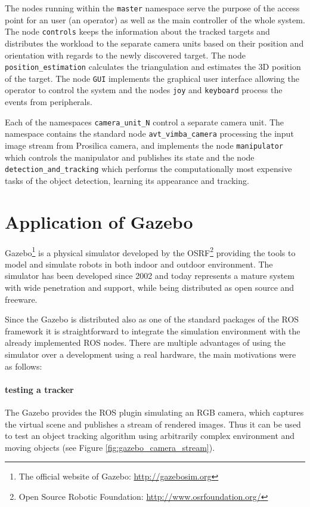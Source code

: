 The nodes running within the \texttt{master} namespace serve the purpose of the access point for an user (an operator) as well as the main controller of the whole system. The node \texttt{controls} keeps the information about the tracked targets and distributes the workload to the separate camera units based on their position and orientation with regards to the newly discovered target. The node \texttt{position\_estimation} calculates the triangulation and estimates the 3D position of the target. The node \texttt{GUI} implements the graphical user interface allowing the operator to control the system and the nodes \texttt{joy} and \texttt{keyboard} process the events from peripherals.

Each of the namespaces \texttt{camera\_unit\_N} control a separate camera unit. The namespace contains the standard node \texttt{avt\_vimba\_camera} processing the input image stream from Prosilica camera, and implements the node \texttt{manipulator} which controls the manipulator and publishes its state and the node \texttt{detection\_and\_tracking} which performs the computationally most expensive tasks of the object detection, learning its appearance and tracking.

\section{Application of Gazebo} \label{txt:application_of_gazebo}

Gazebo\footnote{The official website of Gazebo: \url{http://gazebosim.org}} is a physical simulator developed by the OSRF\footnote{Open Source Robotic Foundation: \url{http://www.osrfoundation.org/}} providing the tools to model and simulate robots in both indoor and outdoor environment. The simulator has been developed since 2002 and today represents a mature system with wide penetration and support, while being distributed as open source and freeware. 

Since the Gazebo is distributed also as one of the standard packages of the ROS framework it is straightforward to integrate the simulation environment with the already implemented ROS nodes. There are multiple advantages of using the simulator over a development using a real hardware, the main motivations were as follows:

\paragraph{testing a tracker} The Gazebo provides the ROS plugin simulating an RGB camera, which captures the virtual scene and publishes a stream of rendered images. Thus it can be used to test an object tracking algorithm using arbitrarily complex environment and moving objects (see Figure \ref{fig:gazebo_camera_stream}).

